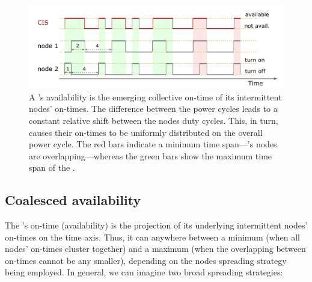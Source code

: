 %
\begin{figure}[t]
		\centering
		\includegraphics[width=\columnwidth]{figures/cisOntime}
		\caption{A \fullsys's availability is the emerging collective on-time of its intermittent nodes' on-times. The difference between the power cycles leads to a constant relative shift between the nodes duty cycles. This, in turn, causes their on-times to be uniformly distributed on the overall power cycle. The red bars indicate a minimum \sys time span---\sys's nodes are overlapping---whereas the green bars show the maximum time span of the \sys.}
		\label{fig:cisOntime}
\end{figure} 
%
\subsection{Coalesced availability}
\label{subSec:availability}
%
The \sys's on-time (availability) is the projection of its underlying intermittent nodes' on-times on the time axis. Thus, it can anywhere between a minimum (when all nodes' on-times cluster together) and a maximum (when the overlapping between on-times cannot be any smaller), depending on the nodes spreading strategy being employed.
%
In general, we can imagine two broad spreading strategies:

